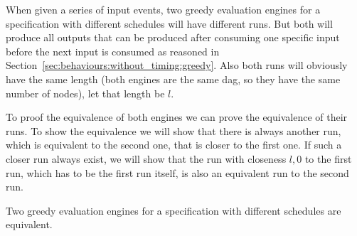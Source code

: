 When given a series of input events, two greedy evaluation engines for a specification with different schedules will have different runs.
But both will produce all outputs that can be produced after consuming one specific input before the next input is consumed as reasoned in Section~\ref{sec:behaviours:without_timing:greedy}.
Also both runs will obviously have the same length (both engines are the same \gls{dag}, so they have the same number of nodes), let that length be \(l\).

To proof the equivalence of both engines we can prove the equivalence of their runs.
To show the equivalence we will show that there is always another run, which is equivalent to the second one, that is closer to the first one.
If such a closer run always exist, we will show that the run with closeness \(l, 0\) to the first run, which has to be the first run itself, is also an equivalent run to the second run.

\begin{theorem}[name = Equivalence of Different Greedy Evaluation Engines]\label{theorem:equivalence_greedy_eval_engines}
  Two greedy evaluation engines for a specification with different schedules are equivalent.
\end{theorem}

